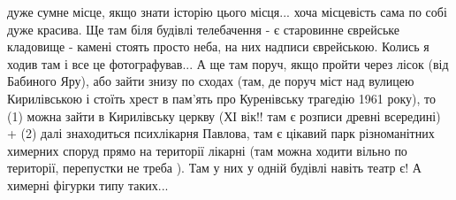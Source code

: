 дуже сумне місце, якщо знати історію цього місця... хоча місцевість сама по
собі дуже красива. Ще там біля будівлі телебачення - є старовинне єврейське
кладовище - камені стоять просто неба, на них надписи єврейською. 
Колись я ходив там і все це фотографував... А ще там поруч, якщо пройти через лісок (від Бабиного Яру),
або зайти знизу по сходах (там, де поруч міст над вулицею Кирилівською і стоїть
хрест в пам'ять про Куренівську трагедію 1961 року), то (1) можна зайти в
Кирилівську церкву (ХІ вік!! там є розписи древні всередині) + (2) далі
знаходиться психлікарня Павлова, там є цікавий парк різноманітних химерних
споруд прямо на території лікарні (там можна ходити вільно по території,
перепустки не треба ). Там у них у одній будівлі навіть театр є! А химерні
фігурки типу таких... 














